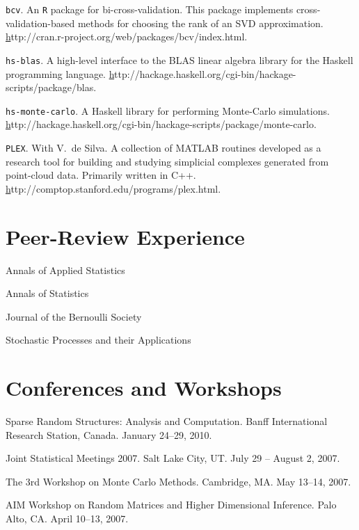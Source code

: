 \documentclass[overlapped,line,letterpaper]{res}
\begin{document}
\begin{resume}
{\texttt{bcv}}.
An \texttt{R} package for bi-cross-validation.  This package implements
cross-validation-based methods for choosing the rank of an SVD approximation.
\href{http://cran.r-project.org/web/packages/bcv/index.html}http://cran.r-project.org/web/packages/bcv/index.html.

{\texttt{hs-blas}}.
A high-level interface to the BLAS linear algebra library for the Haskell
programming language.
\href{http://hackage.haskell.org/cgi-bin/hackage-scripts/package/blas}http://hackage.haskell.org/cgi-bin/hackage-scripts/package/blas.

{\texttt{hs-monte-carlo}}.
A Haskell library for performing Monte-Carlo simulations.
\href{http://hackage.haskell.org/cgi-bin/hackage-scripts/package/monte-carlo}http://hackage.haskell.org/cgi-bin/hackage-scripts/package/monte-carlo.

{\texttt{PLEX}}. With V.\ de Silva.
A collection of \textsc{MATLAB} routines developed as a research tool for building and 
studying simplicial complexes generated from point-cloud data.  Primarily written in C++.  
\href{http://comptop.stanford.edu/programs/plex.html}http://comptop.stanford.edu/programs/plex.html.



\section{\bf Peer-Review Experience}

Annals of Applied Statistics

Annals of Statistics

Journal of the Bernoulli Society

Stochastic Processes and their Applications


\section{\bf Conferences and Workshops}

Sparse Random Structures: Analysis and Computation. Banff International
Research Station, Canada. January 24--29, 2010.

Joint Statistical Meetings 2007. Salt Lake City, UT. July 29 -- August 2, 2007.

The 3rd Workshop on Monte Carlo Methods. Cambridge, MA. May 13--14, 2007.

AIM Workshop on Random Matrices and Higher Dimensional Inference. Palo Alto, CA. April 10--13, 2007.


\end{resume}
\end{document}
